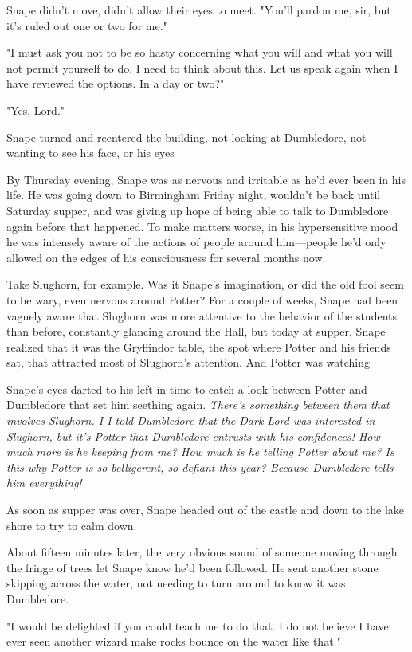 Snape didn't move, didn't allow their eyes to meet. "You'll pardon me, sir, but it's ruled out one or two for me."

"I must ask you not to be so hasty concerning what you will and what you will not permit yourself to do. I need to think about this. Let us speak again when I have reviewed the options. In a day or two?"

"Yes, Lord."

Snape turned and reentered the building, not looking at Dumbledore, not wanting to see his face, or his eyes{\el}

By Thursday evening, Snape was as nervous and irritable as he'd ever been in his life. He was going down to Birmingham Friday night, wouldn't be back until Saturday supper, and was giving up hope of being able to talk to Dumbledore again before that happened. To make matters worse, in his hypersensitive mood he was intensely aware of the actions of people around him—people he'd only allowed on the edges of his consciousness for several months now.

Take Slughorn, for example. Was it Snape's imagination, or did the old fool seem to be wary, even nervous around Potter? For a couple of weeks, Snape had been vaguely aware that Slughorn was more attentive to the behavior of the students than before, constantly glancing around the Hall, but today at supper, Snape realized that it was the Gryffindor table, the spot where Potter and his friends sat, that attracted most of Slughorn's attention. And Potter was watching{\el}

Snape's eyes darted to his left in time to catch a look between Potter and Dumbledore that set him seething again. \emph{There's something between them that involves Slughorn. I{\el} I told Dumbledore that the Dark Lord was interested in Slughorn, but it's Potter that Dumbledore entrusts with his confidences! How much more is he keeping from me? How much is he telling Potter about me? Is this why Potter is so belligerent, so defiant this year? Because Dumbledore tells him everything!}

As soon as supper was over, Snape headed out of the castle and down to the lake shore to try to calm down.

About fifteen minutes later, the very obvious sound of someone moving through the fringe of trees let Snape know he'd been followed. He sent another stone skipping across the water, not needing to turn around to know it was Dumbledore.

"I would be delighted if you could teach me to do that. I do not believe I have ever seen another wizard make rocks bounce on the water like that."

